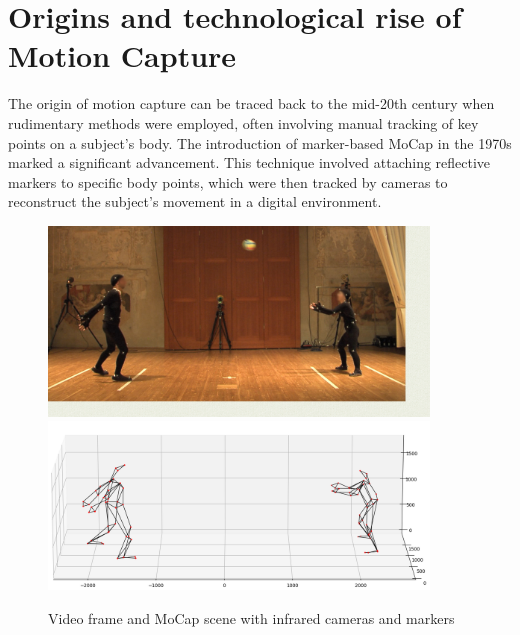 \section{Origins and technological rise of Motion Capture}
The origin of motion capture can be traced back to the mid-20th century when rudimentary methods were employed, 
often involving manual tracking of key points on a subject's body. 
The introduction of marker-based MoCap in the 1970s marked a significant advancement. 
This technique involved attaching reflective markers to specific body points, 
which were then tracked by cameras to reconstruct the subject's movement in a digital environment. 
\begin{figure}[H]
    \centering
    \includegraphics[width=0.9\textwidth]{graphics/bodyMarkersExampleImage.png}
    \includegraphics[width=0.9\textwidth]{graphics/bodyMarkersExampleMoCap.png}
    \caption{Video frame and MoCap scene with infrared cameras and markers}
    \label{fig:common}
\end{figure}

